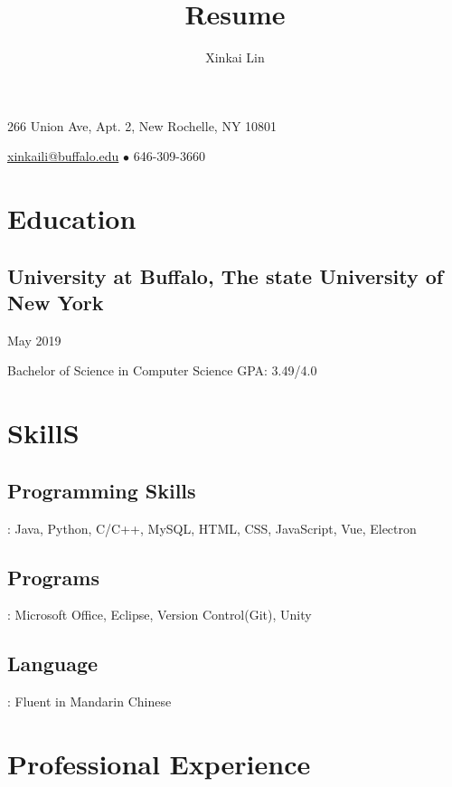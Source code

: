 \documentclass[11pt, letterpaper]{article} %
\makeatletter
\renewcommand{\maketitle}{
\begin{center}
{\Huge\bfseries
\theauthor}

266 Union Ave, Apt. 2, New Rochelle, NY 10801

\href{mailto:xinkaili@buffalo.edu}{xinkaili@buffalo.edu} $\bullet$ 646-309-3660

\end{center}
}
\makeatother
\begin{document}
\title{Resume} 
\author{Xinkai Lin}

\maketitle


\section{Education}
\subsection{University at Buffalo, The state University of New York}
\hspace*{\fill}May 2019

\noindent Bachelor of Science in Computer Science 
\hspace*{\fill}GPA: 3.49/4.0\\


\section{SkillS}
\subsection{Programming Skills}
: Java, Python, C/C++, MySQL, HTML, CSS, JavaScript, Vue, Electron

\subsection{Programs}
: Microsoft Office, Eclipse, Version Control(Git), Unity

\subsection{Language}
: Fluent in Mandarin Chinese\\


\section{Professional Experience}
\end{document}
